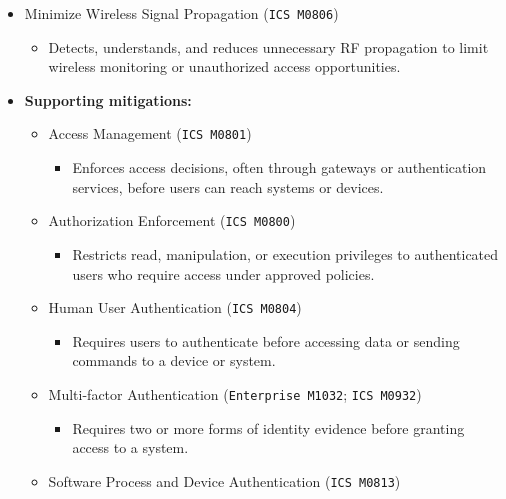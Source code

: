 \documentclass[10pt,a4paper,oneside]{report}
\begin{document}
\begin{itemize}
\begin{itemize}
\begin{itemize}
\item Filters ingress, egress, or lateral traffic, including protocol-aware rules, to restrict malicious or unnecessary communication.
\end{itemize}
\item Minimize Wireless Signal Propagation (\texttt{ICS M0806})
\begin{itemize}
\item Detects, understands, and reduces unnecessary RF propagation to limit wireless monitoring or unauthorized access opportunities.
\end{itemize}
\end{itemize}
\end{itemize}

\begin{itemize}
\item \textbf{Supporting mitigations:}
\begin{itemize}
\item Access Management (\texttt{ICS M0801})
\begin{itemize}
\item Enforces access decisions, often through gateways or authentication services, before users can reach systems or devices.
\end{itemize}
\item Authorization Enforcement (\texttt{ICS M0800})
\begin{itemize}
\item Restricts read, manipulation, or execution privileges to authenticated users who require access under approved policies.
\end{itemize}
\item Human User Authentication (\texttt{ICS M0804})
\begin{itemize}
\item Requires users to authenticate before accessing data or sending commands to a device or system.
\end{itemize}
\item Multi-factor Authentication (\texttt{Enterprise M1032}; \texttt{ICS M0932})
\begin{itemize}
\item Requires two or more forms of identity evidence before granting access to a system.
\end{itemize}
\item Software Process and Device Authentication (\texttt{ICS M0813})
\begin{itemize}

\end{itemize}
\end{itemize}
\end{itemize}
\end{document}
